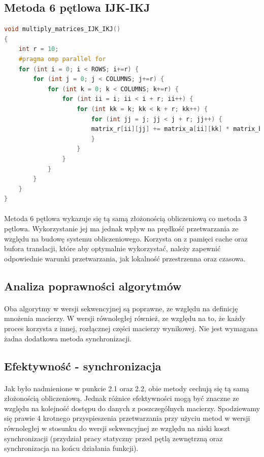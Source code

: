 \documentclass{scrartcl}
\begin{document}
\subsection{Metoda 6 pętlowa IJK-IKJ}
\begin{lstlisting}[language=C++, caption={Metoda sześciopętlowa}]
void multiply_matrices_IJK_IKJ()
{
	int r = 10;
	#pragma omp parallel for
	for (int i = 0; i < ROWS; i+=r) {
		for (int j = 0; j < COLUMNS; j+=r) {
			for (int k = 0; k < COLUMNS; k+=r) {
				for (int ii = i; ii < i + r; ii++) {
					for (int kk = k; kk < k + r; kk++) {
						for (int jj = j; jj < j + r; jj++) {
						matrix_r[ii][jj] += matrix_a[ii][kk] * matrix_b[kk][jj];
						}
					}
				}
			}
		}
	}
}
\end{lstlisting}
\paragraph{}Metoda 6 pętlowa wykazuje się tą samą złożonością obliczeniową co metoda 3 pętlowa. Wykorzystanie jej ma jednak wpływ na prędkość przetwarzania ze względu na budowę systemu obliczeniowego. Korzysta on z pamięci cache oraz bufora translacji, które aby optymalnie wykorzystać, należy zapewnić odpowiednie warunki przetwarzania, jak lokalność przestrzenna oraz czasowa.
\subsection{Analiza poprawności algorytmów}
\paragraph{}Oba algorytmy w wersji sekwencyjnej są poprawne, ze względu na definicję mnożenia macierzy. W wersji równoległej również, ze względu na to, że każdy proces korzysta z innej, rozłącznej części macierzy wynikowej. Nie jest wymagana żadna dodatkowa metoda synchronizacji.
\subsection{Efektywność - synchronizacja}
\paragraph{}Jak było nadmienione w punkcie 2.1 oraz 2.2, obie metody cechują się tą samą złożonością obliczeniową. Jednak różnice efektywności mogą być znaczne ze względu na kolejność dostępu do danych z poszczególnych macierzy. Spodziewamy się prawie 4 krotnego przyspieszenia przetwarzania przy użyciu metod w wersji równoległej w stosunku do wersji sekwencyjnej ze względu na niski koszt synchronizacji (przydział pracy statyczny przed pętlą zewnętrzną oraz synchronizacja na końcu działania funkcji).
\newpage
\end{document}
